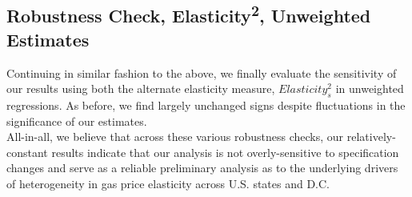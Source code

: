 \documentclass[12pt,a4paper]{article}
\begin{document}
\subsection{Robustness Check, Elasticity\textsuperscript{2}, Unweighted Estimates}
Continuing in similar fashion to the above, we finally evaluate the sensitivity of our results using both the alternate elasticity measure, $Elasticity^{2}_{s}$ in unweighted regressions. As before, we find largely unchanged signs despite fluctuations in the significance of our estimates. \\

All-in-all, we believe that across these various robustness checks, our relatively-constant results indicate that our analysis is not overly-sensitive to specification changes and serve as a reliable preliminary analysis as to the underlying drivers of heterogeneity in gas price elasticity across U.S. states and D.C. 

\begin{table}[H]
	\begin{center}
		
		\label{main_estimates_y2}
		\caption[Alternate Main Predictor Estimates, Unweighted]{Turning to unweighted estimates using our secondary elasticity outcome, we once again find largely similar results, indicating that our weighting decision is not altering our results unduly.}
	\end{center}
\end{table}

\begin{table}[H]
	\begin{center}
		
		\label{environmental_estimates_y2}
		\caption[Alternate Environmental Predictor Estimates, Unweighted]{Continuing as described in table \ref{main_estimates_y2}, we find largely similar results in unweighted regressions using our alternate elasticity measure.}
	\end{center}
\end{table}

\begin{table}[H]
	\begin{center}
		
		\label{transportation_estimates_y2}
		\caption[Alternate Transportation Infrastructure Predictor Estimates, Unweighted]{Continuing as described in table \ref{main_estimates_y2}, we find largely similar results in unweighted regressions using our alternate elasticity measure.}
	\end{center}
\end{table}
\end{document}
